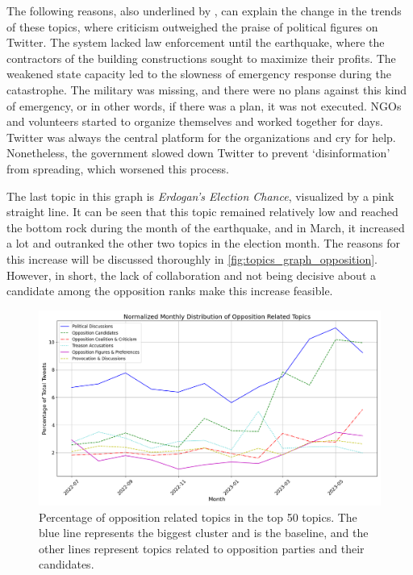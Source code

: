 The following reasons, also underlined by \textcite{cevik_aksoy_turkey_earthquake_2023}, can explain 
the change in the trends of these topics, where criticism outweighed the praise of political figures 
on Twitter. The system lacked law enforcement until the earthquake, where the 
contractors of the building constructions sought to maximize their profits. 
The weakened state capacity led to the slowness of emergency response during the catastrophe. 
The military was missing, and there were no plans against this kind of emergency, or in other words, 
if there was a plan, it was not executed. 
NGOs and volunteers started to organize themselves and worked together for days. Twitter was always 
the central platform for the organizations and cry for help. Nonetheless, the government slowed down 
Twitter to prevent `disinformation' from spreading, which worsened this process.

The last topic in this graph is \textit{Erdogan's Election Chance}, visualized by a pink straight line. 
It can be seen that this topic remained relatively low and reached the bottom rock during the month 
of the earthquake, and in March, it increased a lot and outranked the other two topics in the election 
month. The reasons for this increase will be discussed thoroughly in \autoref{fig:topics_graph_opposition}. 
However, in short, the lack of collaboration and not being decisive about a candidate among the 
opposition ranks make this increase feasible.

\begin{figure}[htb]
    \centering
    \includegraphics[width=\linewidth]{figures/normalized_opposition_selected_topics_distribution_with_styles.png}
    \caption[Normalized monthly distribution of opposition related topics]
    {Percentage of opposition related topics in the top 50 topics. 
    The blue line represents the biggest cluster and is the baseline, 
    and the other lines represent topics related to opposition parties and their candidates.}\label{fig:topics_graph_opposition}
\end{figure}

